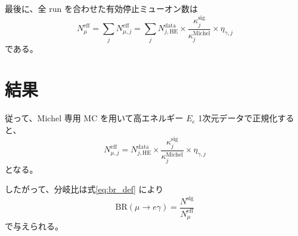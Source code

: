 \documentclass[a4paper,11pt]{jsarticle}
\begin{document}
最後に、全 run を合わせた有効停止ミューオン数は
\begin{equation}
N_{\mu}^{\mathrm{eff}}
=
\sum_j N_{\mu,j}^{\mathrm{eff}}
=
\sum_j
N_{j,\mathrm{HE}}^{\mathrm{data}}
\times
\frac{\kappa_{j}^{\mathrm{sig}}}{\kappa_{j}^{\mathrm{Michel}}}
\times
\eta_{\gamma,j}
\end{equation}
である。

\section{結果}
従って、Michel 専用 MC を用いて高エネルギー $E_e$ 1次元データで正規化すると、
\begin{equation}
\boxed{
N_{\mu,j}^{\mathrm{eff}}
=
N_{j,\mathrm{HE}}^{\mathrm{data}}
\times
\frac{\kappa_{j}^{\mathrm{sig}}}{\kappa_{j}^{\mathrm{Michel}}}
\times
\eta_{\gamma,j}
}
\end{equation}
となる。

したがって、分岐比は式\eqref{eq:br_def} により
\begin{equation}
\mathrm{BR}(\mu\to e\gamma)
=
\frac{N^{\mathrm{sig}}}{N_{\mu}^{\mathrm{eff}}}
\end{equation}
で与えられる。
\end{document}
